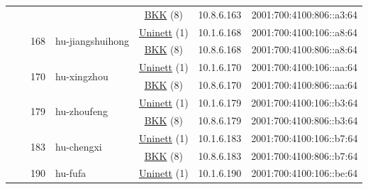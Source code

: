 \begin{small}
\begin{center}
\begin{longtable}{|c|c|c|c|c|c|c|c|}
  &  &  &  & \multicolumn{2}{|c|}{\tiny{\href{http://bkk.no}{BKK} (8)}} & \tiny{10.8.6.163} & \tiny{2001:700:4100:806::a3:64} \\* \cline{3-3}\cline{4-4}\cline{5-5}\cline{6-6}\cline{7-7}\cline{8-8}
  &  & \multirow{2}{*}{\tiny{168}} & \multicolumn{1}{|l|}{\multirow{2}{*}{\tiny{hu-jiangshuihong}}} & \multicolumn{2}{|c|}{\tiny{\href{https://www.uninett.no}{Uninett} (1)}} & \tiny{10.1.6.168} & \tiny{2001:700:4100:106::a8:64} \\* \cline{5-5}\cline{6-6}\cline{7-7}\cline{8-8}
  &  &  &  & \multicolumn{2}{|c|}{\tiny{\href{http://bkk.no}{BKK} (8)}} & \tiny{10.8.6.168} & \tiny{2001:700:4100:806::a8:64} \\* \cline{3-3}\cline{4-4}\cline{5-5}\cline{6-6}\cline{7-7}\cline{8-8}
  &  & \multirow{2}{*}{\tiny{170}} & \multicolumn{1}{|l|}{\multirow{2}{*}{\tiny{hu-xingzhou}}} & \multicolumn{2}{|c|}{\tiny{\href{https://www.uninett.no}{Uninett} (1)}} & \tiny{10.1.6.170} & \tiny{2001:700:4100:106::aa:64} \\* \cline{5-5}\cline{6-6}\cline{7-7}\cline{8-8}
  &  &  &  & \multicolumn{2}{|c|}{\tiny{\href{http://bkk.no}{BKK} (8)}} & \tiny{10.8.6.170} & \tiny{2001:700:4100:806::aa:64} \\* \cline{3-3}\cline{4-4}\cline{5-5}\cline{6-6}\cline{7-7}\cline{8-8}
  &  & \multirow{2}{*}{\tiny{179}} & \multicolumn{1}{|l|}{\multirow{2}{*}{\tiny{hu-zhoufeng}}} & \multicolumn{2}{|c|}{\tiny{\href{https://www.uninett.no}{Uninett} (1)}} & \tiny{10.1.6.179} & \tiny{2001:700:4100:106::b3:64} \\* \cline{5-5}\cline{6-6}\cline{7-7}\cline{8-8}
  &  &  &  & \multicolumn{2}{|c|}{\tiny{\href{http://bkk.no}{BKK} (8)}} & \tiny{10.8.6.179} & \tiny{2001:700:4100:806::b3:64} \\* \cline{3-3}\cline{4-4}\cline{5-5}\cline{6-6}\cline{7-7}\cline{8-8}
  &  & \multirow{2}{*}{\tiny{183}} & \multicolumn{1}{|l|}{\multirow{2}{*}{\tiny{hu-chengxi}}} & \multicolumn{2}{|c|}{\tiny{\href{https://www.uninett.no}{Uninett} (1)}} & \tiny{10.1.6.183} & \tiny{2001:700:4100:106::b7:64} \\* \cline{5-5}\cline{6-6}\cline{7-7}\cline{8-8}
  &  &  &  & \multicolumn{2}{|c|}{\tiny{\href{http://bkk.no}{BKK} (8)}} & \tiny{10.8.6.183} & \tiny{2001:700:4100:806::b7:64} \\* \cline{3-3}\cline{4-4}\cline{5-5}\cline{6-6}\cline{7-7}\cline{8-8}
  &  & \multirow{2}{*}{\tiny{190}} & \multicolumn{1}{|l|}{\multirow{2}{*}{\tiny{hu-fufa}}} & \multicolumn{2}{|c|}{\tiny{\href{https://www.uninett.no}{Uninett} (1)}} & \tiny{10.1.6.190} & \tiny{2001:700:4100:106::be:64} \\* \cline{5-5}\cline{6-6}\cline{7-7}\cline{8-8}

\end{longtable}
\end{center}
\end{small}

